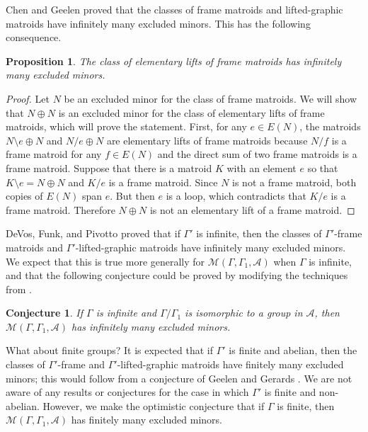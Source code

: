 \documentclass[12pt]{article}
\newtheorem{proposition}[theorem]{Proposition}
\newtheorem{conjecture}[theorem]{Conjecture}
\theoremstyle{definition}
\newcommand{\cA}{\mathcal{A}}
\newcommand{\cM}{\mathcal{M}}
\newcommand{\del}{\!\setminus\!}
\begin{document}
Chen and Geelen \cite{Chen-Geelen-2018} proved that the classes of frame matroids and lifted-graphic matroids have infinitely many excluded minors.
This has the following consequence.

\begin{proposition}
The class of elementary lifts of frame matroids has infinitely many excluded minors.
\end{proposition}
\begin{proof}
Let $N$ be an excluded minor for the class of frame matroids.
We will show that $N \oplus N$ is an excluded minor for the class of elementary lifts of frame matroids, which will prove the statement.
First, for any $e \in E(N)$, the matroids $N\del e \oplus N$ and $N/e \oplus N$ are elementary lifts of frame matroids because $N/f$ is a frame matroid for any $f \in E(N)$ and the direct sum of two frame matroids is a frame matroid.
Suppose that there is a matroid $K$ with an element $e$ so that $K \del e = N \oplus N$ and $K/e$ is a frame matroid.
Since $N$ is not a frame matroid, both copies of $E(N)$ span $e$.
But then $e$ is a loop, which contradicts that $K/e$ is a frame matroid.
Therefore $N \oplus N$ is not an elementary lift of a frame matroid.
\end{proof}

DeVos, Funk, and Pivotto \cite[Theorem 1.6]{DeVos-Funk-Pivotto-2014} proved that if $\Gamma'$ is infinite, then the classes of $\Gamma'$-frame matroids and $\Gamma'$-lifted-graphic matroids have infinitely many excluded minors.
We expect that this is true more generally for $\cM(\Gamma, \Gamma_1, \cA)$ when $\Gamma$ is infinite, and that the following conjecture could be proved by modifying the techniques from \cite{DeVos-Funk-Pivotto-2014}.

\begin{conjecture} \label{conj: excluded minors infinite case}
If $\Gamma$ is infinite and $\Gamma/\Gamma_1$ is isomorphic to a group in $\cA$, then $\cM(\Gamma, \Gamma_1, \cA)$ has infinitely many excluded minors.
\end{conjecture}



What about finite groups?
It is expected that if $\Gamma'$ is finite and abelian, then the classes of $\Gamma'$-frame and $\Gamma'$-lifted-graphic matroids have finitely many excluded minors; this would follow from a conjecture of Geelen and Gerards \cite[Conjecture 1.1]{Geelen-Gerards-2009}.
We are not aware of any results or conjectures for the case in which $\Gamma'$ is finite and non-abelian.
However, we make the optimistic conjecture that if $\Gamma$ is finite, then $\cM(\Gamma, \Gamma_1, \cA)$ has finitely many excluded minors.
\end{document}
